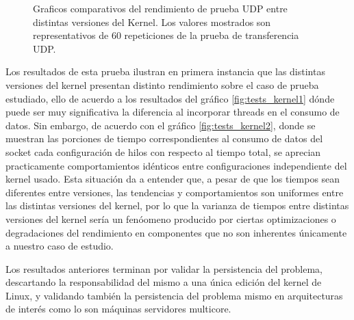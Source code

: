 \begin{figure}[h!]
	\centering
	\hspace*{\fill}
	\hfill
	\caption{Graficos comparativos del rendimiento de prueba UDP entre distintas versiones del Kernel. Los valores mostrados son representativos de 60 repeticiones de la prueba de transferencia UDP.}
	\label{fig:tests_kernel}
	\hspace*{\fill}
\end{figure}

Los resultados de esta prueba ilustran en primera instancia que las distintas versiones del kernel presentan distinto rendimiento sobre el caso de prueba estudiado, ello de acuerdo a los resultados del gráfico \ref{fig:tests_kernel1} dónde puede ser muy significativa la diferencia al incorporar threads en el consumo de datos. Sin embargo, de acuerdo con el gráfico \ref{fig:tests_kernel2}, donde se muestran las porciones de tiempo correspondientes al consumo de datos del socket cada configuración de hilos con respecto al tiempo total, se aprecian practicamente comportamientos idénticos entre configuraciones independiente del kernel usado. Esta situación da a entender que, a pesar de que los tiempos sean diferentes entre versiones, las tendencias y comportamientos son uniformes entre las distintas versiones del kernel, por lo que la varianza de tiempos entre distintas versiones del kernel sería un fenóomeno producido por ciertas optimizaciones o degradaciones del rendimiento en componentes que no son inherentes únicamente a nuestro caso de estudio.

Los resultados anteriores terminan por validar la persistencia del problema, descartando la responsabilidad del mismo a una única edición del kernel de Linux, y validando también la persistencia del problema mismo en arquitecturas de interés como lo son máquinas servidores multicore.

